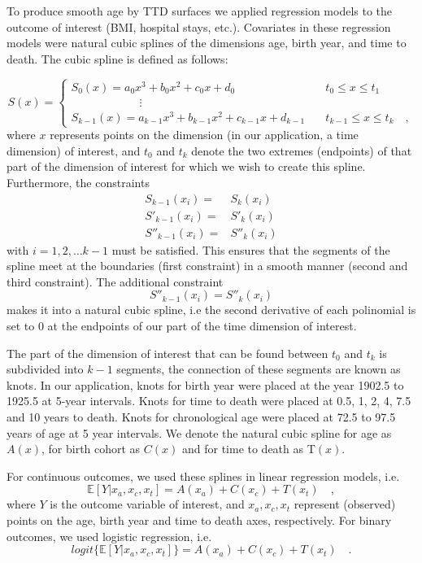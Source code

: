 \documentclass[11pt,oneside,a4paper]{article} %
\begin{document}
\begin{appendices}
To produce smooth age by TTD surfaces we applied regression models to the outcome of interest (BMI, hospital stays, etc.). Covariates in these regression models were natural cubic splines of the dimensions age, birth year, and time to death. The cubic spline is defined as follows:

\begin{equation}
S(x) = \begin{cases}
    S_0(x) = a_0x^3+b_0x^2+c_0x+d_0 &\quad t_0 \le x \le t_1 \\
    \quad\quad\quad\quad\quad\quad \vdots \\
    S_{k-1}(x) = a_{k-1}x^3 +b_{k-1}x^2+c_{k-1}x+d_{k-1} &\quad t_{k-1} \le x \le t_k        \quad ,   
\end{cases}
\end{equation}
where $x$ represents points on the dimension (in our application, a time dimension) of interest, and $t_0$ and $t_k$  denote the two extremes (endpoints) of that part of the dimension of interest for which we wish to create this spline. Furthermore, the constraints
\begin{align}
S_{k-1}(x_i) =& S_k(x_i)\\
S'_{k-1}(x_i) =& S'_k(x_i)\\
S''_{k-1}(x_i) =& S''_k(x_i)
\end{align}
with $i=1,2,\ldots k-1$ must be satisfied. This ensures that the segments of the spline meet at the boundaries (first constraint) in a smooth manner (second and third constraint). The additional constraint
\begin{equation}
S''_{k-1}(x_i) = S''_k(x_i)
\end{equation}
makes it into a natural cubic spline, i.e the second derivative of each polinomial is set to 0 at the endpoints of our part of the time dimension of interest.

The part of the dimension of interest that can be found between $t_0$ and $t_k$ is subdivided into $k-1$ segments, the connection of these segments are known as knots. In our application, knots for birth year were placed at the year 1902.5 to 1925.5 at 5-year intervals. Knots for time to death were placed at 0.5, 1, 2, 4, 7.5 and 10 years to death. Knots for chronological age were placed at 72.5 to 97.5 years of age at 5 year intervals. We denote the natural cubic spline for age as $A(x)$, for birth cohort as $C(x)$ and for time to death as T$(x)$.

For continuous outcomes, we used these splines in linear regression models, i.e.
\begin{equation}
\mathbb{E}[Y| x_a,x_c,x_t]=A(x_a)+C(x_c)+T(x_t) \quad,
\end{equation}
where $Y$ is the outcome variable of interest, and $x_a,x_c,x_t$ represent (observed) points on the age, birth year and time to death axes, respectively. For binary outcomes, we used logistic regression, i.e.
\begin{equation}
logit\{\mathbb{E}[Y| x_a,x_c,x_t]\}=A(x_a)+C(x_c)+T(x_t) \quad .
\end{equation}


\end{appendices}
\end{document}
